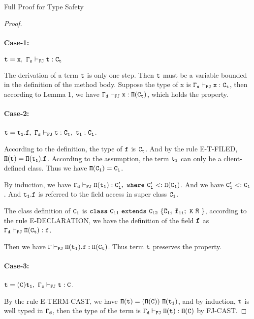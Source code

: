\begin{section}{Full Proof for Type Safety}
\begin{proof}
\paragraph{Case-1:}
$\tt t=x,\ \Gamma_s\vdash_{FJ} t:C_t$
\par
The derivation of a term $\tt t$ is only one step. Then $\tt t$ must be a variable bounded in the definition of the method body. Suppose the type of x is $\tt\Gamma_s\vdash_{FJ} x:C_t$, then according to Lemma 1, we have $\tt\Gamma_d\vdash_{FJ} x:\Pi(C_t)$, which holds the property.


\paragraph{Case-2:}
$\tt t=t_1.f,\ \Gamma_s\vdash_{FJ} t:C_t,\ t_1:C_1$.
\par
According to the definition, the type of $\tt f$ is $\tt C_t$. And by the rule E-T-FILED, $\tt \Pi(t)=\Pi(t_1).f$. 
According to the assumption, the term $\tt t_1$ can only be a client-defined class. Thus we have $\tt \Pi(C_1)=C_1$.
\par
By induction, we have $\tt \Gamma_d\vdash_{FJ}\Pi(t_1):C'_1,\ where\ C'_1<:\Pi(C_1)$. And we have $\tt C'_1<:C_1$. And $\tt t_1.f$ is referred to the field access in super class $\tt C_1$.
\par
The class definition of $\tt C_1$ is $\tt class\ C_{11}\ extends\ C_{12}\ \{ \bar{C}_{1i}\ \bar{f}_{1i};\ K\ \bar{M}\ \}$, according to the rule E-DECLARATION, we have the definition of the field $\tt f$ as $\tt \Gamma_d\vdash_{FJ} \Pi(C_t):f$. 
\par
Then we have $\tt \Gamma\vdash_{FJ} \Pi(t_1).f:\Pi(C_t)$. Thus term $\tt t$ preserves the property.

\paragraph{Case-3:}
$\tt t=(C) t_1,\ \Gamma_s\vdash_{FJ} t:C$.
\par
By the rule E-TERM-CAST, we have $\tt\Pi(t)=(\Pi(C))\ \Pi(t_1)$, and by induction, $\tt t$ is well typed in $\tt\Gamma_d$, then the type of the term is $\tt\Gamma_d\vdash_{FJ} \Pi(t):\Pi(C)$ by FJ-CAST.


\end{proof}
\end{section}
